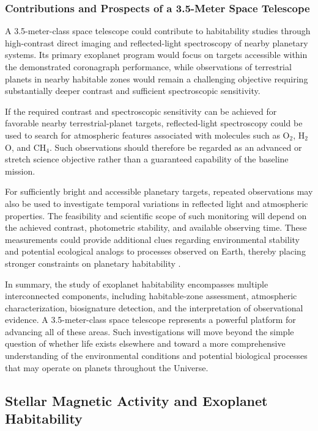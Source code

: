 \subsubsection{Contributions and Prospects of a 3.5-Meter Space Telescope}
A 3.5-meter-class space telescope could contribute to habitability studies through high-contrast direct imaging and reflected-light spectroscopy of nearby planetary systems. Its primary exoplanet program would focus on targets accessible within the demonstrated coronagraph performance, while observations of terrestrial planets in nearby habitable zones would remain a challenging objective requiring substantially deeper contrast and sufficient spectroscopic sensitivity.

If the required contrast and spectroscopic sensitivity can be achieved for favorable nearby terrestrial-planet targets, reflected-light spectroscopy could be used to search for atmospheric features associated with molecules such as O$_2$, H$_2$O, and CH$_4$. Such observations should therefore be regarded as an advanced or stretch science objective rather than a guaranteed capability of the baseline mission.

For sufficiently bright and accessible planetary targets, repeated observations may also be used to investigate temporal variations in reflected light and atmospheric properties. The feasibility and scientific scope of such monitoring will depend on the achieved contrast, photometric stability, and available observing time.
These measurements could provide additional clues regarding environmental stability and potential ecological analogs to processes observed on Earth, thereby placing stronger constraints on planetary habitability \cite{robinson2018}.

In summary, the study of exoplanet habitability encompasses multiple interconnected components, including habitable-zone assessment, atmospheric characterization, biosignature detection, and the interpretation of observational evidence. A 3.5-meter-class space telescope represents a powerful platform for advancing all of these areas. Such investigations will move beyond the simple question of whether life exists elsewhere and toward a more comprehensive understanding of the environmental conditions and potential biological processes that may operate on planets throughout the Universe.

\subsection{Stellar Magnetic Activity and Exoplanet Habitability}\label{stellar-magnetic-activity-and-exoplanet-habitability}

